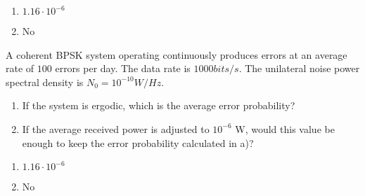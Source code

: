 \documentclass[es,boletin]{uah}
\begin{document}
{

\begin{enumerate}
	\item $1.16 \cdot 10^{-6}$
	\item No
\end{enumerate}
}
{


	\cite{Sklar} A coherent BPSK system operating continuously produces errors at an average rate of $100$ errors per day. The data rate is $1000 bits/s$. The unilateral noise power spectral density is $N_0 = 10^{-10} W/Hz$. 


\begin{enumerate}
	\item If the system is ergodic, which is the average error probability?
	\item If the average received power is adjusted to $10^{-6}$ W, would this value be enough to keep the error probability calculated in a)?
\end{enumerate} 

}
{

\begin{enumerate}
	\item $1.16 \cdot 10^{-6}$
	\item No
\end{enumerate}
}
\end{document}
